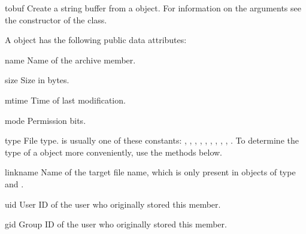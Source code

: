 \begin{methoddesc}{tobuf}{}
    Create a string buffer from a  object. For information
    on the arguments see the constructor of the  class.
\end{methoddesc}

A  object has the following public data attributes:

\begin{memberdesc}{name}
    Name of the archive member.
\end{memberdesc}

\begin{memberdesc}{size}
    Size in bytes.
\end{memberdesc}

\begin{memberdesc}{mtime}
    Time of last modification.
\end{memberdesc}

\begin{memberdesc}{mode}
    Permission bits.
\end{memberdesc}

\begin{memberdesc}{type}
    File type.   is usually one of these constants:
    , , ,
    , , ,
    , , ,
    .  To determine the type of a
     object more conveniently, use the 
    methods below.
\end{memberdesc}

\begin{memberdesc}{linkname}
    Name of the target file name, which is only present in
     objects of type  and
    .
\end{memberdesc}

\begin{memberdesc}{uid}
    User ID of the user who originally stored this member.
\end{memberdesc}

\begin{memberdesc}{gid}
    Group ID of the user who originally stored this member.
\end{memberdesc}

